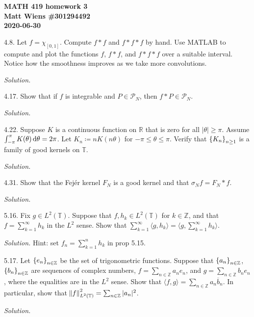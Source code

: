 \documentclass{article}
\newcommand{\Pc}{\mathcal{P}}
\newcommand{\T}{\mathbb{T}}
\newcommand{\R}{\mathbb{R}}
\newcommand{\Z}{\mathbb{Z}}
\begin{document}
\textbf{MATH 419 homework 3} \\
\textbf{Matt Wiens \#301294492} \\
\textbf{2020-06-30}

4.8. Let $f = \chi_{[0, 1]}$. Compute $f * f$ and $f * f * f$ by hand.
Use MATLAB to compute and plot the functions $f$, $f * f$, and
$f * f * f$ over a suitable interval. Notice how the smoothness improves
as we take more convolutions.

\textit{Solution.}

\newpage

4.17. Show that if $f$ is integrable and $P \in \Pc_N$, then $f * P \in \Pc_N$.

\textit{Solution.}

\newpage

4.22. Suppose $K$ is a continuous function on $\R$ that is zero for all
$|\theta| \geq \pi$. Assume $\int_{- \pi}^\pi K(\theta) \dif \theta = 2 \pi$.
Let $K_n \coloneqq n K(n \theta)$ for $- \pi \leq \theta \leq \pi$. Verify
that $\cbr{K_n}_{n \geq 1}$ is a family of good kernels on $\T$.

\textit{Solution.}

\newpage

4.31. Show that the Fejér kernel $F_N$ is a good kernel and that
$\sigma_N f = F_N * f$.

\textit{Solution.}

\newpage

5.16. Fix $g \in L^2(\T)$. Suppose that $f, h_k \in L^2(\T)$ for $k \in \Z$,
and that $f = \sum_{k = 1}^\infty h_k$ in the $L^2$ sense. Show that
$\sum_{k = 1}^\infty \langle g, h_k \rangle = \langle g, \sum_{k = 1}^\infty h_k \rangle$.

\textit{Solution.}
Hint: set $f_n = \sum_{k = 1}^n h_k$ in prop 5.15.

\newpage

5.17. Let $\cbr{e_n}_{n \in \Z}$ be the set of trigonometric functions.
Suppose that $\cbr{a_n}_{n \in \Z}$, $\cbr{b_n}_{n \in \Z}$ are sequences
of complex numbers, $f = \sum_{n \in \Z} a_n e_n$, and
$g = \sum_{n \in \Z} b_n e_n$, where the equalities are in the $L^2$ sense.
Show that $\langle f, g \rangle = \sum_{n \in \Z} a_n \overline{b}_n$.
In particular, show that $\norm{f}^2_{L^2(\T)} = \sum_{n \in \Z} |a_n|^2$.

\textit{Solution.}
\end{document}
